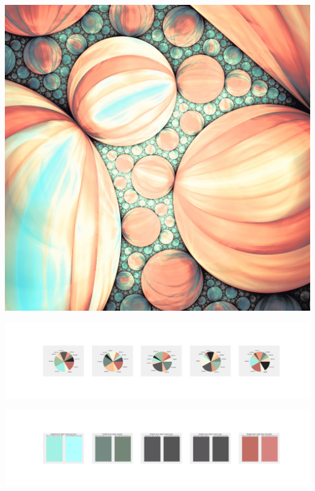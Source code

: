 \documentclass[11pt]{article}
\begin{document}
\begin{landscape}
    \begin{center}
    \includegraphics[width=\textwidth]{./nbimg/file (320).jpg}
    \end{center}

    \begin{center}
    \includegraphics[width=250mm]{./nbimg/pie-246.jpg}
    \end{center}

    \begin{center}
    \includegraphics[width=250mm]{./nbimg/peak-246.jpg}
    \end{center}
    


\end{landscape}
\end{document}
